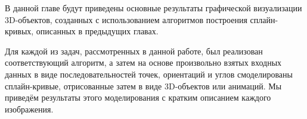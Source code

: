 В данной главе будут приведены основные результаты графической визуализации 3D-объектов, созданных с использованием
алгоритмов построения сплайн-кривых, описанных в предыдущих главах.

Для каждой из задач, рассмотренных в данной работе, был реализован соответствующий алгоритм, а затем на основе
произвольно взятых входных данных в виде последовательностей точек, ориентаций и углов смоделированы сплайн-кривые,
отрисованные затем в виде 3D-объектов или анимаций. Мы приведём результаты этого моделирования с кратким описанием
каждого изображения.
